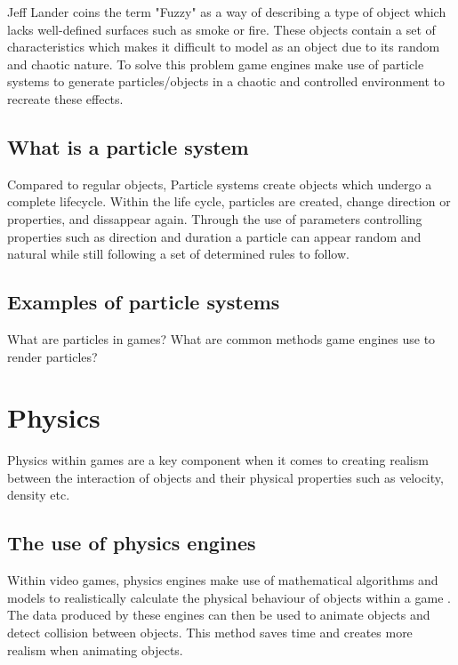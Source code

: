 \documentclass{article} %
\begin{document}
Jeff Lander coins the term "Fuzzy" as a way of describing a type of object which lacks well-defined surfaces such as smoke or fire. \cite{Lander_1998} These objects contain a set of characteristics which makes it difficult to model as an object due to its random and chaotic nature. To solve this problem game engines make use of particle systems to generate particles/objects in a chaotic and controlled environment to recreate these effects.

\subsection{What is a particle system}

Compared to regular objects, Particle systems create objects which undergo a complete lifecycle. Within the life cycle, particles are created, change direction or properties, and dissappear again. Through the use of parameters controlling properties such as direction and duration a particle can appear random and natural while still following a set of determined rules to follow.

\subsection{Examples of particle systems}



What are particles in games?
What are common methods game engines use to render particles?

\newpage

\section{Physics}

Physics within games are a key component when it comes to creating realism between the interaction of objects and their physical properties such as velocity, density etc. 

\subsection{The use of physics engines}

Within video games, physics engines make use of mathematical algorithms and models to realistically calculate the physical behaviour of objects within a game \cite{Ipacs_2023}. The data produced by these engines can then be used to animate objects and detect collision between objects. This method saves time and creates more realism when animating objects.
\end{document}
